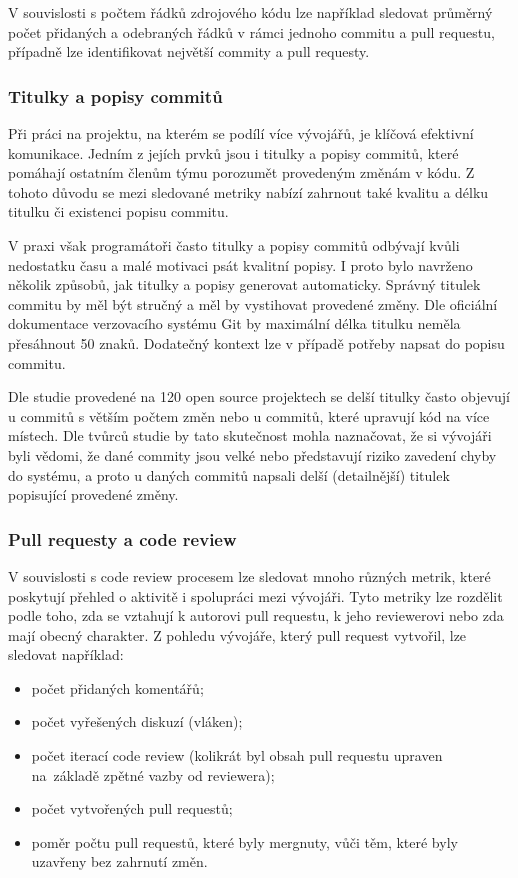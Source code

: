 V souvislosti s počtem řádků zdrojového kódu lze například sledovat průměrný počet přidaných a odebraných řádků v rámci jednoho commitu a pull requestu, případně lze identifikovat největší commity a pull requesty.

\subsubsection{Titulky a popisy commitů}\label{commit-message}
Při práci na projektu, na kterém se podílí více vývojářů, je klíčová efektivní komunikace. Jedním z jejích prvků jsou i titulky a popisy commitů, které pomáhají ostatním členům týmu porozumět provedeným změnám v kódu. Z tohoto důvodu se mezi sledované metriky nabízí zahrnout také kvalitu a délku titulku či existenci popisu commitu.

V praxi však programátoři často titulky a popisy commitů odbývají kvůli nedostatku času a malé motivaci psát kvalitní popisy. I proto bylo navrženo několik způsobů, jak titulky a popisy generovat automaticky. \cite{good-commit-message} Správný titulek commitu by měl být stručný a měl by vystihovat provedené změny. Dle oficiální dokumentace verzovacího systému Git by maximální délka titulku neměla přesáhnout 50 znaků. Dodatečný kontext lze v případě potřeby napsat do popisu commitu. \cite{git-commit}

Dle studie \cite{commit-title-lenght} provedené na 120 open source projektech se delší titulky často objevují u commitů s větším počtem změn nebo u commitů, které upravují kód na více místech. Dle tvůrců studie by tato skutečnost mohla naznačovat, že si vývojáři byli vědomi, že dané commity jsou velké nebo představují riziko zavedení chyby do systému, a proto u daných commitů napsali delší (detailnější) titulek popisující provedené změny.

\subsubsection{Pull requesty a code review}
V souvislosti s code review procesem lze sledovat mnoho různých metrik, které poskytují přehled o aktivitě i spolupráci mezi vývojáři. Tyto metriky lze rozdělit podle toho, zda se vztahují k autorovi pull requestu, k jeho reviewerovi nebo zda mají obecný charakter. Z pohledu vývojáře, který pull request vytvořil, lze sledovat například:
\begin{itemize}[topsep=4pt, itemsep=2pt]
    \item počet přidaných komentářů;
    \item počet vyřešených diskuzí (vláken);
    \item počet iterací code review (kolikrát byl obsah pull requestu upraven na~základě zpětné vazby od reviewera);
    \item počet vytvořených pull requestů;
    \item poměr počtu pull requestů, které byly mergnuty, vůči těm, které byly uzavřeny bez zahrnutí změn.
\end{itemize}

